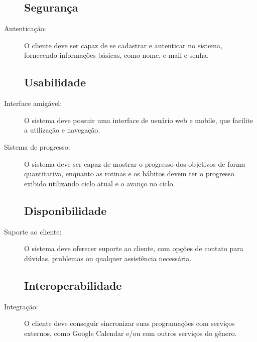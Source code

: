 \begin{description}
  \subsection*{Segurança}

  \item[Autenticação:] O cliente deve ser capaz de se cadastrar e autenticar no
    sistema, fornecendo informações básicas, como nome, e-mail e senha.

  \subsection*{Usabilidade}

  \item[Interface amigável:] O sistema deve possuir uma interface de usuário web e
  mobile, que facilite a utilização e navegação.

  \item[Sistema de progresso:] O sistema deve ser capaz de mostrar o progresso
    dos objetivos de forma quantitativa, enquanto as rotinas e os hábitos devem ter
    o progresso exibido utilizando ciclo atual e o avanço no ciclo.

  \subsection*{Disponibilidade}

  \item[Suporte ao cliente:] O sistema deve oferecer suporte ao cliente, com
  opções de contato para dúvidas, problemas ou qualquer assistência necessária.

  \subsection*{Interoperabilidade}

  \item[Integração:] O cliente deve conseguir sincronizar suas programações com
  serviços externos, como Google Calendar e/ou com outros serviços do gênero.

\end{description}
